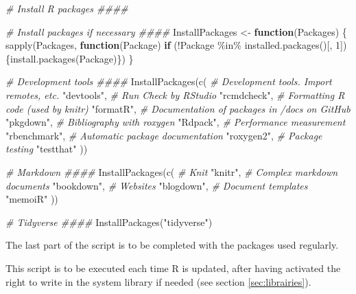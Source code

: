 \documentclass[
  12pt,
  american,
  a4paper,
  extrafontsizes,onecolumn,openright
  ]{memoir}
\newenvironment{Shaded}{\begin{snugshade}}{\end{snugshade}}
\newcommand{\CommentTok}[1]{\textcolor[rgb]{0.56,0.35,0.01}{\textit{#1}}}
\newcommand{\ControlFlowTok}[1]{\textcolor[rgb]{0.13,0.29,0.53}{\textbf{#1}}}
\newcommand{\DecValTok}[1]{\textcolor[rgb]{0.00,0.00,0.81}{#1}}
\newcommand{\FunctionTok}[1]{\textcolor[rgb]{0.00,0.00,0.00}{#1}}
\newcommand{\NormalTok}[1]{#1}
\newcommand{\OtherTok}[1]{\textcolor[rgb]{0.56,0.35,0.01}{#1}}
\newcommand{\SpecialCharTok}[1]{\textcolor[rgb]{0.00,0.00,0.00}{#1}}
\newcommand{\StringTok}[1]{\textcolor[rgb]{0.31,0.60,0.02}{#1}}
\newlength{\rf}
\begin{document}
\begin{Shaded}
\begin{Highlighting}[]
\CommentTok{\# Install R packages \#\#\#\#}

\CommentTok{\# Install packages if necessary \#\#\#\#}
\NormalTok{InstallPackages }\OtherTok{\textless{}{-}} \ControlFlowTok{function}\NormalTok{(Packages) \{}
  \FunctionTok{sapply}\NormalTok{(Packages, }\ControlFlowTok{function}\NormalTok{(Package) }
    \ControlFlowTok{if}\NormalTok{ (}\SpecialCharTok{!}\NormalTok{Package }\SpecialCharTok{\%in\%} \FunctionTok{installed.packages}\NormalTok{()[, }\DecValTok{1}\NormalTok{]) }
\NormalTok{      \{}\FunctionTok{install.packages}\NormalTok{(Package)\})}
\NormalTok{\}}


\CommentTok{\# Development tools \#\#\#\#}
\FunctionTok{InstallPackages}\NormalTok{(}\FunctionTok{c}\NormalTok{(}
  \CommentTok{\# Development tools. Import remotes, etc.}
  \StringTok{"devtools"}\NormalTok{,}
  \CommentTok{\# Run Check by RStudio}
  \StringTok{"rcmdcheck"}\NormalTok{,}
  \CommentTok{\# Formatting R code (used by knitr)}
  \StringTok{"formatR"}\NormalTok{,}
  \CommentTok{\# Documentation of packages in /docs on GitHub}
  \StringTok{"pkgdown"}\NormalTok{,}
  \CommentTok{\# Bibliography with roxygen}
  \StringTok{"Rdpack"}\NormalTok{,}
  \CommentTok{\# Performance measurement}
  \StringTok{"rbenchmark"}\NormalTok{,}
  \CommentTok{\# Automatic package documentation}
  \StringTok{"roxygen2"}\NormalTok{,}
  \CommentTok{\# Package testing}
  \StringTok{"testthat"}
\NormalTok{  ))}

\CommentTok{\# Markdown \#\#\#\#}
\FunctionTok{InstallPackages}\NormalTok{(}\FunctionTok{c}\NormalTok{(}
  \CommentTok{\# Knit}
  \StringTok{"knitr"}\NormalTok{,}
  \CommentTok{\# Complex markdown documents}
  \StringTok{"bookdown"}\NormalTok{,}
  \CommentTok{\# Websites}
  \StringTok{"blogdown"}\NormalTok{,}
  \CommentTok{\# Document templates}
  \StringTok{"memoiR"}
\NormalTok{  ))}

\CommentTok{\# Tidyverse \#\#\#\#}
\FunctionTok{InstallPackages}\NormalTok{(}\StringTok{"tidyverse"}\NormalTok{)}
\end{Highlighting}
\end{Shaded}

\normalsize

The last part of the script is to be completed with the packages used regularly.

This script is to be executed each time R is updated, after having activated the right to write in the system library if needed (see section \ref{sec:librairies}).
\end{document}
